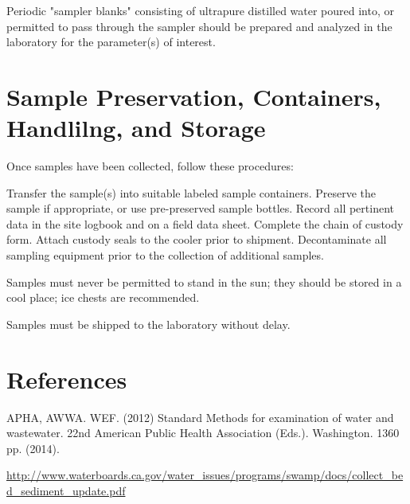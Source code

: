 \documentclass[12pt]{../SOP4_alpha}\usepackage[]{graphicx}\usepackage[]{xcolor}
\begin{document}
\NP Periodic "sampler blanks" consisting of ultrapure distilled water poured into, or permitted to pass through the sampler should be prepared and analyzed in the laboratory for the parameter(s) of interest.


\section{Sample Preservation, Containers, Handlilng, and Storage}\label{subsec:preservation}

Once samples have been collected, follow these procedures:

\NP Transfer the sample(s) into suitable labeled sample containers.
\NP Preserve the sample if appropriate, or use pre-preserved sample bottles.
\NP Record all pertinent data in the site logbook and on a field data sheet.
\NP Complete the chain of custody form.
\NP Attach custody seals to the cooler prior to shipment.
\NP Decontaminate all sampling equipment prior to the collection of additional
samples. 

\NP Samples must never be permitted to stand in the sun; they should be stored in a cool place; ice chests are recommended. 

\NP Samples must be shipped to the laboratory without delay. 

\section{References}

\NP APHA, AWWA. WEF. (2012) Standard Methods for examination of water and wastewater. 22nd American Public Health Association (Eds.). Washington. 1360 pp. (2014).

\NP \url{http://www.waterboards.ca.gov/water_issues/programs/swamp/docs/collect_bed_sediment_update.pdf}
\end{document}
